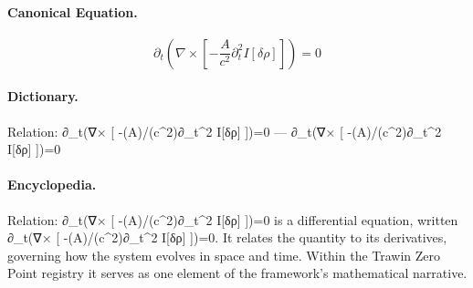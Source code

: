 \paragraph{Canonical Equation.}
\[
\partial_t(\nabla\times [ -\frac{A}{c^2}\partial_t^2 I[\delta\rho] ])=0
\]

\paragraph{Dictionary.}
Relation: ∂\_t(∇× [ -(A)/(c\textasciicircum{}2)∂\_t\textasciicircum{}2 I[δρ] ])=0 — ∂\_t(∇× [ -(A)/(c\textasciicircum{}2)∂\_t\textasciicircum{}2 I[δρ] ])=0

\paragraph{Encyclopedia.}
Relation: ∂\_t(∇× [ -(A)/(c\textasciicircum{}2)∂\_t\textasciicircum{}2 I[δρ] ])=0 is a differential equation, written ∂\_t(∇× [ -(A)/(c\textasciicircum{}2)∂\_t\textasciicircum{}2 I[δρ] ])=0. It relates the quantity to its derivatives, governing how the system evolves in space and time. Within the Trawin Zero Point registry it serves as one element of the framework's mathematical narrative.
